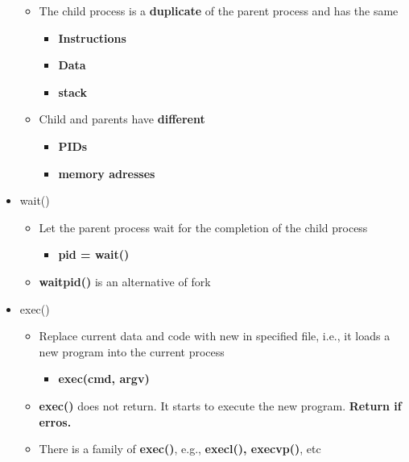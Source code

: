 \documentclass[a4paper,11pt,english]{article}
\begin{document}
\begin{itemize}
\begin{itemize}
            \item The child process is a \textbf{\color{red}duplicate} of the parent process and has the same 
                \begin{itemize}
                    \item \textbf{\color{blue}Instructions}
                    \item \textbf{\color{blue}Data}
                    \item \textbf{\color{blue}stack}
                \end{itemize}
            \item Child and parents have \textbf{\color{red}different}
                \begin{itemize}
                    \item \textbf{\color{blue}PIDs}
                    \item \textbf{\color{blue}memory adresses}
                \end{itemize}
        \end{itemize}
    \item wait()
        \begin{itemize}
            \item Let the parent process wait for the completion of the child process
                \begin{itemize}
                    \item \textbf{\color{blue}pid = wait()}
                \end{itemize}
            \item \textbf{\color{blue}waitpid()} is an alternative of fork
        \end{itemize}
    \item exec()
        \begin{itemize}
            \item Replace current data and code with new in specified file, i.e., it loads a new program into the current process
                \begin{itemize}
                    \item \textbf{\color{blue}exec(cmd, argv)} 
                \end{itemize}
            \item \textbf{\color{blue}exec()} does not return. It starts to execute the new program. \textbf{\color{red}Return if erros.}
            \item There is a family of \textbf{\color{blue}exec()}, e.g., \textbf{\color{blue}execl(), execvp()}, etc

\end{itemize}
\end{itemize}
\end{document}
